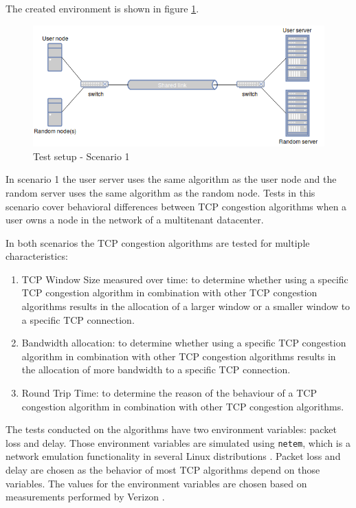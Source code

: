 \documentclass{article}
\begin{document}
	The created environment is shown in figure \ref{fig:setup1}.

	\begin{figure}[H] 
		\centering
  			\includegraphics[scale=0.5]{figs/setup2.png}
  			\caption{Test setup - Scenario 1}
  		\label{fig:setup1}
	\end{figure}
	
	In scenario 1 the user server uses the same algorithm as the user node and the random server uses the same algorithm as the random node. Tests in this scenario cover behavioral differences between TCP congestion algorithms when a user owns a node in the network of a multitenant datacenter.
	
	In both scenarios the TCP congestion algorithms are tested for multiple characteristics:
	\begin{enumerate}
		\item TCP Window Size measured over time: to determine whether using a specific TCP congestion algorithm in combination with other TCP congestion algorithms results in the allocation of a larger window or a smaller window to a specific TCP connection.
		\item Bandwidth allocation: to determine whether using a specific TCP congestion algorithm in combination with other TCP congestion algorithms results in the allocation of more bandwidth to a specific TCP connection.
		\item Round Trip Time: to determine the reason of the behaviour of a TCP congestion algorithm in combination with other TCP congestion algorithms.
	\end{enumerate}
The tests conducted on the algorithms have two environment variables: packet loss and delay. Those environment variables are simulated using \texttt{netem}, which is a network emulation functionality in several Linux distributions \cite{linux-netem}. Packet loss and delay are chosen as the behavior of most TCP algorithms depend on those variables. The values for the environment variables are chosen based on measurements performed by Verizon \cite{verizon-latency}.
\end{document}
